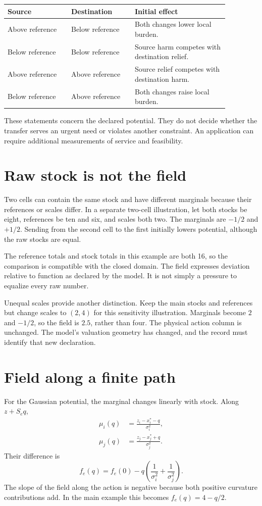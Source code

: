 \begin{center}
\begin{tabular}{P{0.25\linewidth}P{0.25\linewidth}P{0.37\linewidth}}
\toprule
Source & Destination & Initial effect\\
\midrule
Above reference & Below reference & Both changes lower local burden.\\
Below reference & Below reference & Source harm competes with destination relief.\\
Above reference & Above reference & Source relief competes with destination harm.\\
Below reference & Above reference & Both changes raise local burden.\\
\bottomrule
\end{tabular}
\end{center}
These statements concern the declared potential. They do not decide whether the transfer serves an urgent need or violates another constraint. An application can require additional measurements of service and feasibility.

\section{Raw stock is not the field}
Two cells can contain the same stock and have different marginals because their references or scales differ. In a separate two-cell illustration, let both stocks be eight, references be ten and six, and scales both two. The marginals are \(-1/2\) and \(+1/2\). Sending from the second cell to the first initially lowers potential, although the raw stocks are equal.

The reference totals and stock totals in this example are both 16, so the comparison is compatible with the closed domain. The field expresses deviation relative to function as declared by the model. It is not simply a pressure to equalize every raw number.

Unequal scales provide another distinction. Keep the main stocks and references but change scales to \((2,4)\) for this sensitivity illustration. Marginals become \(2\) and \(-1/2\), so the field is \(2.5\), rather than four. The physical action column is unchanged. The model's valuation geometry has changed, and the record must identify that new declaration.

\section{Field along a finite path}
For the Gaussian potential, the marginal changes linearly with stock. Along \(z+S_eq\),
\begin{align}
 \mu_i(q)&=\frac{z_i-x_i^*-q}{\sigma_i^2},\\
 \mu_j(q)&=\frac{z_j-x_j^*+q}{\sigma_j^2}.
\end{align}
Their difference is
\begin{equation}\label{eq:field-along-edge}
 f_e(q)=f_e(0)-q\left(\frac1{\sigma_i^2}+\frac1{\sigma_j^2}\right).
\end{equation}
The slope of the field along the action is negative because both positive curvature contributions add. In the main example this becomes \(f_e(q)=4-q/2\).

